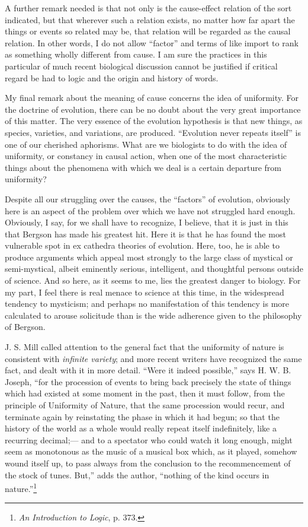 \documentclass[a4paper, 11pt, oneside, polutonikogreek, english, landscape]{article}
\begin{document}
A further remark needed is that not only is the cause-effect relation of the sort indicated, but that wherever such a relation exists, no matter how far apart the things or events so related may be, that relation will be regarded as the causal relation. In other words, I do not allow ``factor'' and terms of like import to rank as something wholly different from cause. I am sure the practices in this particular of much recent biological discussion cannot be justified if critical regard be had to logic and the origin and history of words.

My final remark about the meaning of cause concerns the idea of uniformity. For the doctrine of evolution, there can be no doubt about the very great importance of this matter. The very essence of the evolution hypothesis is that new things, as species, varieties, and variations, are produced. ``Evolution never repeats itself'' is one of our cherished aphorisms. What are we biologists to do with the idea of uniformity, or constancy in causal action, when one of the most characteristic things about the phenomena with which we deal is a certain departure from uniformity?

Despite all our struggling over the causes, the ``factors'' of evolution, obviously here is an aspect of the problem over which we have not struggled hard enough. Obviously, I say, for we shall have to recognize, I believe, that it is just in this that Bergson has made his greatest hit. Here it is that he has found the most vulnerable spot in ex cathedra theories of evolution. Here, too, he is able to produce arguments which appeal most strongly to the large class of mystical or semi-mystical, albeit eminently serious, intelligent, and thoughtful persons outside of science. And so here, as it seems to me, lies the greatest danger to biology. For my part, I feel there is real menace to science at this time, in the widespread tendency to mysticism; and perhaps no manifestation of this tendency is more calculated to arouse solicitude than is the wide adherence given to the philosophy of Bergson.

J. S. Mill called attention to the general fact that the uniformity of nature is consistent with \emph{infinite variety}; and more recent writers have recognized the same fact, and dealt with it in more detail. ``Were it indeed possible,'' says H. W. B. Joseph, ``for the procession of events to bring back precisely the state of things which had existed at some moment in the past, then it must follow, from the principle of Uniformity of Nature, that the same procession would recur, and terminate again by reinstating the phase in which it had begun; so that the history of the world as a whole would really repeat itself indefinitely, like a recurring decimal;--- and to a spectator who could watch it long enough, might seem as monotonous as the music of a musical box which, as it played, somehow wound itself up, to pass always from the conclusion to the recommencement of the stock of tunes. But,'' adds the author, ``nothing of the kind occurs in nature.''\footnote{\emph{An Introduction to Logic}, p. 373.}
\end{document}
